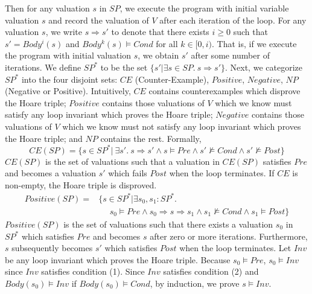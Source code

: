 Then for any valuation $s$ in $SP$, we execute the program with initial variable valuation $s$ and record the valuation of $V$ after each iteration of the loop. For any valuation $s$, we write $s \Rightarrow s'$ to denote that there exists $i \geq 0$ such that $s' = Body^i(s)$ and $Body^k(s) \models Cond$ for all $k \in [0, i)$.
That is, if we execute the program with initial valuation $s$, we obtain $s'$ after some number of iterations. We define $SP^*$ to be the set $\{s' | \exists s \in SP.~s \Rightarrow s'\}$. Next, we categorize $SP^*$ into the four disjoint sets: $CE$ (Counter-Example), $Positive$, $Negative$, $NP$ (Negative or Positive). Intuitively, $CE$ contains counterexamples which disprove the Hoare triple; $Positive$ contains those valuations of $V$ which we know must satisfy any loop invariant which proves the Hoare triple; $Negative$ contains those valuations of $V$ which we know must not satisfy any loop invariant which proves the Hoare triple; and $NP$ contains the rest. Formally,
\[
CE(SP) = \{s \in SP^* |~\exists s'.~s \Rightarrow s' \land s \models \mathit{Pre} \land s' \not \models Cond \land s' \not \models Post\} \]
$CE(SP)$ is the set of valuations such that a valuation in $CE(SP)$ satisfies $Pre$ and becomes a valuation $s'$ which fails $Post$ when the loop terminates. If $CE$ is non-empty, the Hoare triple is disproved.
\begin{align*}
Positive(SP) = & \{s \in SP^* | \exists s_0,s_1: SP^*. \\
& ~~~~~~ s_0 \models Pre \land s_0 \Rightarrow s \Rightarrow s_1 \land s_1 \not \models Cond \land s_1 \models Post\}
\end{align*}
$Positive(SP)$ is the set of valuations such that there exists a valuation $s_0$ in $SP^*$ which satisfies $Pre$ and becomes $s$ after zero or more iterations. Furthermore, $s$ subsequently becomes $s'$ which satisfies $Post$ when the loop terminates. Let $Inv$ be any loop invariant which proves the Hoare triple. Because $s_0 \models Pre$, $s_0 \models Inv$ since $Inv$ satisfies condition (1). Since $Inv$ satisfies condition (2) and $Body(s_0) \models Inv$ if $Body(s_0) \models Cond$, by induction, we prove $s \models Inv$.
